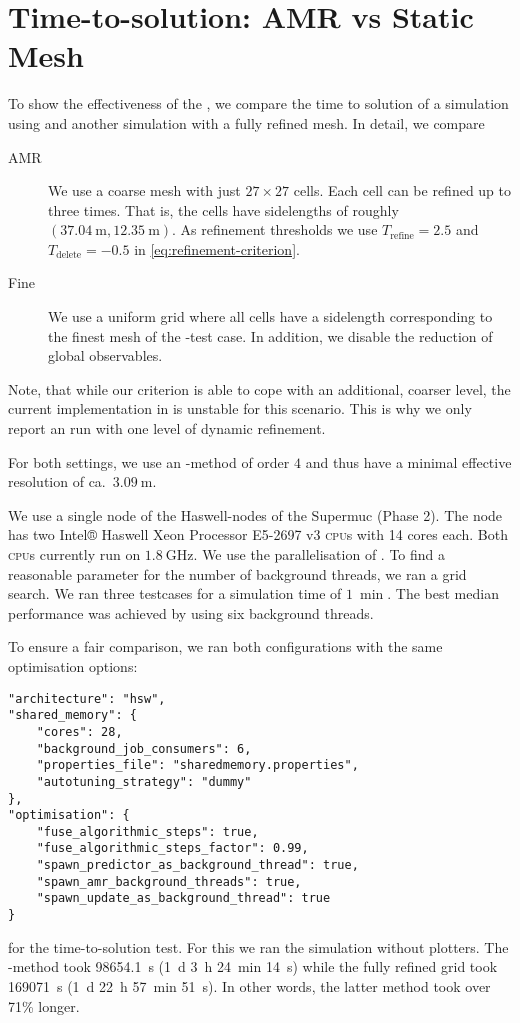\section{Time-to-solution: AMR vs Static Mesh}\label{sec:results-tts-amr}
To show the effectiveness of the \amr{}, we compare the time to solution of a simulation using \amr{} and another simulation with a fully refined mesh.
In detail, we compare
\begin{description}
\item[AMR] We use a coarse mesh with just $27 \times 27$ cells.
  Each cell can be refined up to three times.
  That is, the cells have sidelengths of roughly $\left(\SI{37.04}{\m}, \SI{12.35}{\m} \right)$.
  As refinement thresholds we use $T_\text{refine} = 2.5$ and $T_\text{delete} = -0.5$ in \cref{eq:refinement-criterion}.
\item[Fine] We use a uniform grid where all cells have a sidelength corresponding to the finest mesh of the \amr{}-test case.
  In addition, we disable the reduction of global observables.
\end{description}
Note, that while our \amr{} criterion is able to cope with an additional, coarser level, the current implementation in \exahype{} is unstable for this scenario.
This is why we only report an \amr{} run with one level of dynamic refinement.

For both settings, we use an \aderdg{}-method of order $4$ and thus have a minimal effective resolution of ca.\ $\SI{3.09}{\m}$.

We use a single node of the Haswell-nodes of the Supermuc (Phase 2).
The node has two Intel® Haswell Xeon Processor E5-2697 v3 \textsc{cpu}s with 14 cores each.
Both \textsc{cpu}s currently run on $\SI{1.8}{\GHz}$.
We use the \tbb{} parallelisation of \exahype{}.
To find a reasonable parameter for the number of background threads, we ran a grid search.
We ran three \amr{} testcases for a simulation time of $\SI{1}{\min}$.
The best median performance was achieved by using six background threads.

To ensure a fair comparison, we ran both configurations with the same optimisation options:
\begin{verbatim}
"architecture": "hsw",
"shared_memory": {
    "cores": 28,
    "background_job_consumers": 6,
    "properties_file": "sharedmemory.properties",
    "autotuning_strategy": "dummy"
},
"optimisation": {
    "fuse_algorithmic_steps": true,
    "fuse_algorithmic_steps_factor": 0.99,
    "spawn_predictor_as_background_thread": true,
    "spawn_amr_background_threads": true,
    "spawn_update_as_background_thread": true
}
\end{verbatim}
for the time-to-solution test.
For this we ran the simulation without plotters.
The \amr{}-method took \SI{98654.1}{\s} (\SI{1}{\day} \SI{3}{\hour} \SI{24}{\minute} \SI{14}{\s})
while the fully refined grid took \SI{169071}{\s} (\SI{1}{\day} \SI{22}{\hour} \SI{57}{\minute} \SI{51}{\s}).
In other words, the latter method took over 71\% longer.


